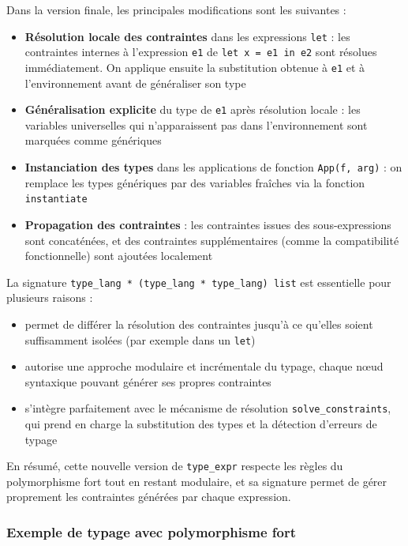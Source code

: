 Dans la version finale, les principales modifications sont les suivantes :
\begin{itemize}
  \item \textbf{Résolution locale des contraintes} dans les expressions \texttt{let} : les contraintes internes à l'expression \texttt{e1} de \texttt{let x = e1 in e2} sont résolues immédiatement. On applique ensuite la substitution obtenue à \texttt{e1} et à l'environnement avant de généraliser son type
  \item \textbf{Généralisation explicite} du type de \texttt{e1} après résolution locale : les variables universelles qui n’apparaissent pas dans l’environnement sont marquées comme génériques
  \item \textbf{Instanciation des types} dans les applications de fonction \texttt{App(f, arg)} : on remplace les types génériques par des variables fraîches via la fonction \texttt{instantiate}
  \item \textbf{Propagation des contraintes} : les contraintes issues des sous-expressions sont concaténées, et des contraintes supplémentaires (comme la compatibilité fonctionnelle) sont ajoutées localement
\end{itemize}

La signature \texttt{type\_lang * (type\_lang * type\_lang) list} est essentielle pour plusieurs raisons :
\begin{itemize}
  \item permet de différer la résolution des contraintes jusqu'à ce qu'elles soient suffisamment isolées (par exemple dans un \texttt{let})
  \item autorise une approche modulaire et incrémentale du typage, chaque nœud syntaxique pouvant générer ses propres contraintes
  \item s’intègre parfaitement avec le mécanisme de résolution \texttt{solve\_constraints}, qui prend en charge la substitution des types et la détection d'erreurs de typage
\end{itemize}

En résumé, cette nouvelle version de \texttt{type\_expr} respecte les règles du polymorphisme fort tout en restant modulaire, et sa signature permet de gérer proprement les contraintes générées par chaque expression.

\subsubsection{Exemple de typage avec polymorphisme fort}

